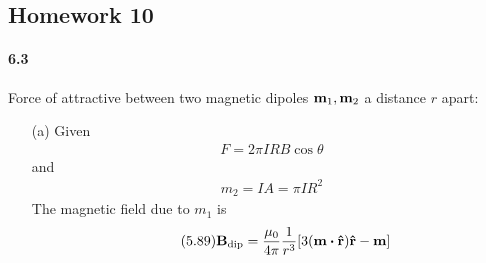 \documentclass[../main.tex]{subfiles}
\begin{document}
\pagestyle{fancy}

\begin{center}
    \section*{Homework 10}
\end{center}

\paragraph{6.3} Force of attractive between two magnetic dipoles $\vb m_1, \vb m_2$ a distance $r$ apart:
\begin{itemize}
    \item [(a)]  Given
    \begin{align*} \tag{6.2}    
        F = 2\pi I R B \cos\theta
    \end{align*}
    and
    \begin{align*}
        m_2 = I A = \pi I R^2
    \end{align*}
    The magnetic field due to $m_1$ is
    \begin{align*} \tag{5.89} \label{eq:hw10_89}
        \vb B_\text{dip} = \frac{\mu_0}{4\pi} \frac{1}{r^3} \qt[
            3 (\vb m \vdot \vu r) \vu r - \vb m
        ]
    \end{align*}
    

\end{itemize}
\end{document}
